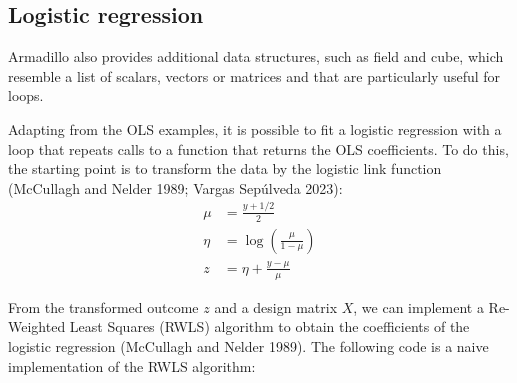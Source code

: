 \hypertarget{logistic-regression}{%
\subsection{Logistic regression}\label{logistic-regression}}

Armadillo also provides additional data structures, such as field and cube,
which resemble a list of scalars, vectors or matrices and that are particularly
useful for loops.

Adapting from the OLS examples, it is possible to fit a logistic regression with
a loop that repeats calls to a function that returns the OLS coefficients. To do
this, the starting point is to transform the data by the logistic link function
(McCullagh and Nelder 1989; Vargas Sepúlveda 2023):
\begin{align*}
\mu &= \frac{y + 1/2}{2} \\
\eta &= \log\left(\frac{\mu}{1-\mu}\right) \\
z &= \eta + \frac{y - \mu}{\mu}
\end{align*}

From the transformed outcome \(z\) and a design matrix \(X\), we can implement a
Re-Weighted Least Squares (RWLS) algorithm to obtain the coefficients of the
logistic regression (McCullagh and Nelder 1989). The following code is a naive
implementation of the RWLS algorithm:

